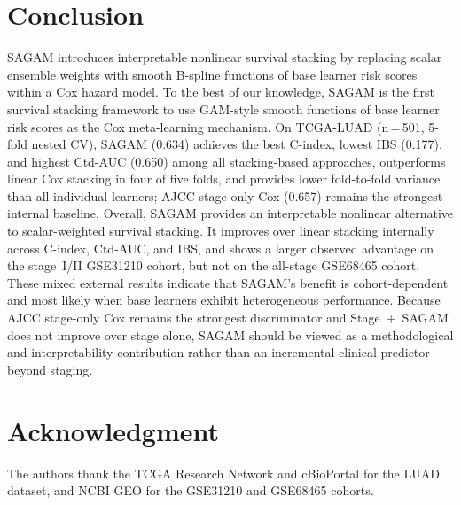 \documentclass[conference]{IEEEtran}
\begin{document}
\section{Conclusion}

SAGAM introduces interpretable nonlinear survival stacking by replacing
scalar ensemble weights with smooth B-spline functions of base learner
risk scores within a Cox hazard model.
To the best of our knowledge, SAGAM is the first survival stacking framework
to use GAM-style smooth functions of base learner risk scores as the
Cox meta-learning mechanism.
On TCGA-LUAD (n\,=\,501, 5-fold nested CV), SAGAM (0.634) achieves the best
C-index, lowest IBS (0.177), and highest Ctd-AUC (0.650) among all
stacking-based approaches, outperforms linear Cox stacking in four of five
folds, and provides lower fold-to-fold variance than all individual learners;
AJCC stage-only Cox (0.657) remains the strongest internal baseline.
Overall, SAGAM provides an interpretable nonlinear alternative to
scalar-weighted survival stacking.
It improves over linear stacking internally across C-index, Ctd-AUC, and IBS,
and shows a larger observed advantage on the stage~I/II GSE31210 cohort, but
not on the all-stage GSE68465 cohort.
These mixed external results indicate that SAGAM's benefit is cohort-dependent
and most likely when base learners exhibit heterogeneous performance.
Because AJCC stage-only Cox remains the strongest discriminator and
Stage~+~SAGAM does not improve over stage alone, SAGAM should be viewed
as a methodological and interpretability contribution rather than an
incremental clinical predictor beyond staging.

\section*{Acknowledgment}
The authors thank the TCGA Research Network and cBioPortal for the LUAD
dataset, and NCBI GEO for the GSE31210 and GSE68465 cohorts.
\end{document}
